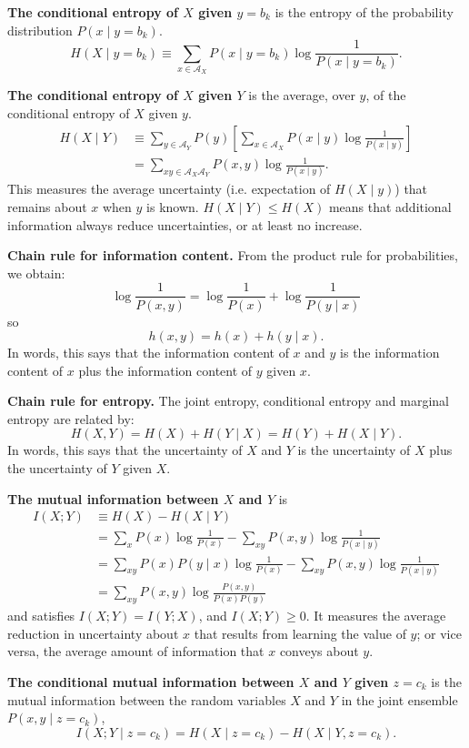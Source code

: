 \documentclass[11pt]{article}
\begin{document}
\textbf{The conditional entropy of $X$ given $y=b_k$} is the entropy of the
probability distribution $P(x\mid y=b_k)$.
\[
  H(X\mid y=b_k) \equiv \sum_{x\in\mathcal{A}_X} P(x\mid y=b_k)\log \frac{1}{P(x\mid y=b_k)}.
\]

\textbf{The conditional entropy of $X$ given $Y$} is the average, over $y$, of
the conditional entropy of $X$ given $y$.
\begin{align*}
  H(X\mid Y)
  &\equiv \sum_{y\in\mathcal{A}_Y} P(y)
  \left[\sum_{x\in\mathcal{A}_X} P(x\mid y)\log \frac{1}{P(x\mid y)}\right]\\
  &= \sum_{xy\in\mathcal{A}_X\mathcal{A}_Y} P(x,y)\log \frac{1}{P(x\mid y)}.
\end{align*}
This measures the average uncertainty (i.e. expectation of $H(X\mid y)$) that remains about $x$ when $y$ is known. $H(X\mid Y) \leq H(X)$ means that additional information always reduce uncertainties, or at least no increase.

\textbf{Chain rule for information content.} From the product rule for
probabilities, we obtain:
\[
  \log \frac{1}{P(x,y)} = \log \frac{1}{P(x)} + \log \frac{1}{P(y\mid x)}
\]
so
\[
  h(x,y) = h(x) + h(y\mid x).
\]
In words, this says that the information content of $x$ and $y$ is the
information content of $x$ plus the information content of $y$ given $x$.

\textbf{Chain rule for entropy.} The joint entropy, conditional entropy and
marginal entropy are related by:
\[
  H(X,Y) = H(X) + H(Y\mid X) = H(Y) + H(X\mid Y).
\]
In words, this says that the uncertainty of $X$ and $Y$ is the uncertainty of
$X$ plus the uncertainty of $Y$ given $X$.

\textbf{The mutual information between $X$ and $Y$} is
\[
  \begin{aligned}
  I(X;Y) &\equiv H(X) - H(X\mid Y) \\
  &= \sum_x P(x) \log \frac{1}{P(x)} - \sum_{xy} P(x,y) \log \frac{1}{P(x \mid y)} \\
  &= \sum_{xy} P(x) P(y \mid x) \log \frac{1}{P(x)} - \sum_{xy} P(x,y) \log \frac{1}{P(x \mid y)} \\
  &= \sum_{xy} P(x,y) \log \frac{P(x,y)}{P(x) P(y)}
  \end{aligned}
\]
and satisfies $I(X;Y)=I(Y;X)$, and $I(X;Y)\geq 0$. It measures the average
reduction in uncertainty about $x$ that results from learning the value of $y$;
or vice versa, the average amount of information that $x$ conveys about $y$.

\textbf{The conditional mutual information between $X$ and $Y$ given $z=c_k$}
is the mutual information between the random variables $X$ and $Y$ in the joint
ensemble $P(x,y\mid z=c_k)$,
\[
  I(X;Y\mid z=c_k) = H(X\mid z=c_k) - H(X\mid Y,z=c_k).
\]
\end{document}
